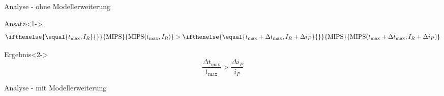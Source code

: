 \documentclass[beamer, xcolor=table]{beamer}
\newcommand{\MIPS}[1][]{
  \ifthenelse {\equal {#1} {}}
  {\text{MIPS}} %
  {\text{MIPS}({#1})} %
}
\renewcommand{\t}[1]{t_\text{#1}}
\begin{document}
	\begin{frame}{Analyse - ohne Modellerweiterung}
		\begin{center}
            \begin{block}{Ansatz}<1->
                \begin{equation*}
                    \MIPS[\t{max}, I_R] >  \MIPS[\t{max} + \Delta \t{max}, I_R +
                    \Delta i_P]
                \end{equation*}
            \end{block}

            \begin{block}{Ergebnis}<2->
                \begin{equation*}
                    \frac{\Delta \t{max}}{\t{max}} >  \frac{\Delta i_P}{i_P}  
                \end{equation*}
            \end{block}
		\end{center}
	\end{frame}

	\begin{frame}{Analyse - mit Modellerweiterung}
          \centering
	\end{frame}
\end{document}
